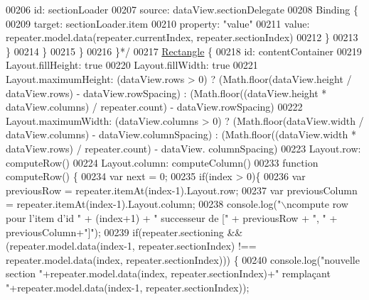 \begin{DoxyCode}
{00206 \textcolor{comment}{                            id: sectionLoader}
00207 \textcolor{comment}{                            source: dataView.sectionDelegate}
00208 \textcolor{comment}{                            Binding \{}
00209 \textcolor{comment}{                                target: sectionLoader.item}
00210 \textcolor{comment}{                                property: "value"}
00211 \textcolor{comment}{                                value: repeater.model.data(repeater.currentIndex, repeater.sectionIndex)}
00212 \textcolor{comment}{                            \}}
00213 \textcolor{comment}{                        \}}
00214 \textcolor{comment}{                    \}}
00215 \textcolor{comment}{                \}}
00216 \textcolor{comment}{            \}*/}
00217         \hyperlink{classRectangle}{Rectangle} \{
00218             \textcolor{keywordtype}{id}: contentContainer
00219             Layout.fillHeight: \textcolor{keyword}{true}
00220             Layout.fillWidth: \textcolor{keyword}{true}
00221             Layout.maximumHeight: (dataView.rows > 0) ? (Math.floor(dataView.height / dataView.rows) - 
      dataView.rowSpacing) : (Math.floor((dataView.height * dataView.columns) / repeater.count) - dataView.rowSpacing)
00222             Layout.maximumWidth: (dataView.columns > 0) ? (Math.floor(dataView.width / dataView.columns) - 
      dataView.columnSpacing) : (Math.floor((dataView.width * dataView.rows) / repeater.count) - dataView.
      columnSpacing)
00223             Layout.row: computeRow()
00224             Layout.column: computeColumn()
00233             function computeRow() \{
00234                 var next = 0;
00235                 \textcolor{keywordflow}{if}(index > 0)\{
00236                     var previousRow = repeater.itemAt(index-1).Layout.row;
00237                     var previousColumn = repeater.itemAt(index-1).Layout.column;
00238                     console.log(\textcolor{stringliteral}{"\(\backslash\)ncompute row pour l'item  d'id "} + (index+1) + \textcolor{stringliteral}{" successeur de ["} + 
      previousRow + \textcolor{stringliteral}{", "} + previousColumn+\textcolor{stringliteral}{"]"});
00239                     \textcolor{keywordflow}{if}(repeater.sectioning && (repeater.model.data(index-1, repeater.sectionIndex) !== 
      repeater.model.data(index, repeater.sectionIndex))) \{
00240                         console.log(\textcolor{stringliteral}{"nouvelle section "}+repeater.model.data(index, repeater.sectionIndex)+\textcolor{stringliteral}{"
       remplaçant "}+repeater.model.data(index-1, repeater.sectionIndex));
}
\end{DoxyCode}
